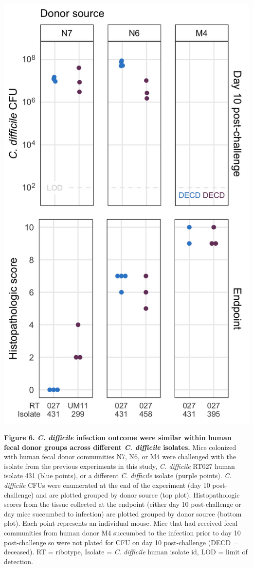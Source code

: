\documentclass[
  12pt,
]{article}
\begin{document}
\includegraphics{../results/figures/figure_6.jpg}

\textbf{Figure 6. \emph{C. difficile} infection outcome were similar
within human fecal donor groups across different \emph{C. difficile}
isolates.} Mice colonized with human fecal donor communities N7, N6, or
M4 were challenged with the isolate from the previous experiments in
this study, \emph{C. difficile} RT027 human isolate 431 (blue points),
or a different \emph{C. difficile} isolate (purple points). \emph{C.
difficile} CFUs were enumerated at the end of the experiment (day 10
post-challenge) and are plotted grouped by donor source (top plot).
Histopathologic scores from the tissue collected at the endpoint (either
day 10 post-challenge or day mice succumbed to infection) are plotted
grouped by donor source (bottom plot). Each point represents an
individual mouse. Mice that had received fecal communities from human
donor M4 succumbed to the infection prior to day 10 post-challenge so
were not plated for CFU on day 10 post-challenge (DECD = deceased). RT =
ribotype, Isolate = \emph{C. difficile} human isolate id, LOD = limit of
detection.
\end{document}
